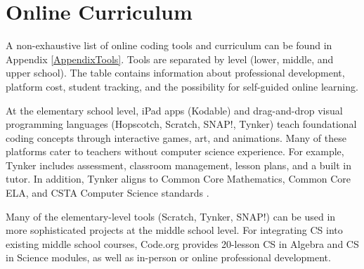 \section{Online Curriculum}
A non-exhaustive list of online coding tools and curriculum can be found in Appendix \ref{AppendixTools}. Tools are separated by level (lower, middle, and upper school). The table contains information about professional development, platform cost, student tracking, and the possibility for self-guided online learning. \par 
At the elementary school level, iPad apps (Kodable) and drag-and-drop visual programming languages (Hopscotch, Scratch, SNAP!, Tynker) teach foundational coding concepts through interactive games, art, and animations. Many of these platforms cater to teachers without computer science experience. For example, Tynker includes assessment, classroom management, lesson plans, and a built in tutor. In addition, Tynker aligns to Common Core Mathematics, Common Core ELA, and CSTA Computer Science standards \cite{tynker}. \par
Many of the elementary-level tools (Scratch, Tynker, SNAP!) can be used in more sophisticated projects at the middle school level. For integrating CS into existing middle school courses, Code.org provides 20-lesson CS in Algebra and CS in Science modules, as well as in-person or online professional development. \par

